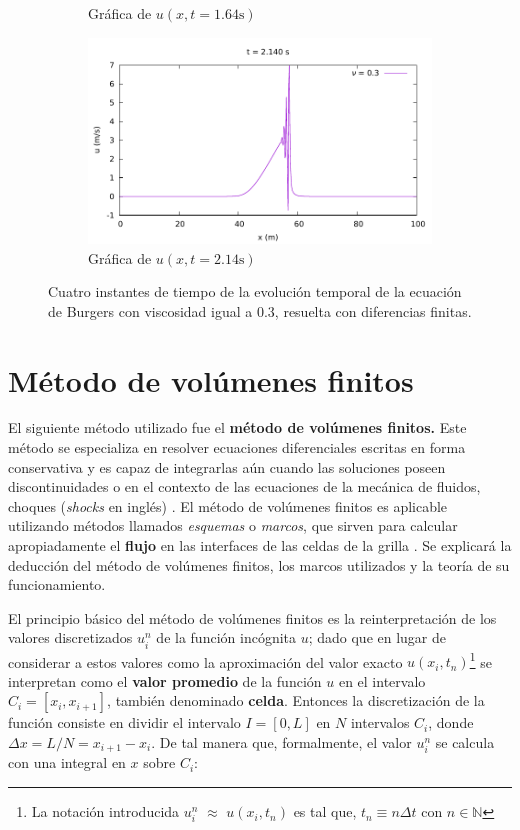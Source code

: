 \documentclass[12pt]{article}
\begin{document}
\begin{figure}[ht]
\begin{subfigure}[b]{0.4\textwidth}
			\caption*{Gráfica de $u(x,t=1.64\unit{\second})$}
			\label{fig:vis0.3-3}
		\end{subfigure}
		\hfill
		\begin{subfigure}[b]{0.4\textwidth}
			\includegraphics[width=\textwidth]{../burg-vis1DDF/results/frames0.3/frame107.pdf}
			\caption*{Gráfica de $u(x,t=2.14\unit{\second})$}
			\label{fig:vis0.3-4}
		\end{subfigure}
		\caption{Cuatro instantes de tiempo de la evolución temporal de la ecuación de Burgers con viscosidad igual a $0.3$, resuelta con diferencias finitas.}
		\label{fig:instantes-nu0.3}
	\end{figure}

	\theoremstyle{definition}
	\newtheorem{definition}{Definición}[section]
	\section{Método de volúmenes finitos}
	El siguiente método utilizado fue el \textbf{método de volúmenes finitos.} Este método se especializa en resolver ecuaciones diferenciales escritas en forma conservativa y es capaz de integrarlas aún cuando las soluciones poseen discontinuidades o  en el contexto de las ecuaciones de la mecánica de fluidos, choques (\textit{shocks} en inglés) \cite{LeVeque1998}. El método de volúmenes finitos es aplicable utilizando métodos llamados \textit{esquemas} o \textit{marcos}, que sirven para calcular apropiadamente el \textbf{flujo} en las interfaces de las celdas de la grilla \cite{LeVeque1998}. Se explicará la deducción del método de volúmenes finitos, los marcos utilizados y la teoría de su funcionamiento.
	
	El principio básico del método de volúmenes finitos es la reinterpretación de los valores discretizados $u_{i}^{n}$ de la función incógnita $u$; dado que en lugar de considerar a estos valores como la aproximación del valor exacto $u(x_{i}, t_{n}) $\footnote{La notación introducida $u_{i}^{n}$ $\approx$ $u(x_{i}, t_{n})$ es tal que, $t_n \equiv n \Delta t $ con $n \in \mathbb{N}$} se interpretan como el \textbf{valor promedio} de la función $u$ en el intervalo $C_{i} = \left[ x_i, x_{i+1} \right]$, también denominado \textbf{celda}. Entonces la discretización de la función consiste en dividir el intervalo $I = [0,L]$ en $N$ intervalos $C_i$, donde $\Delta x = L/N = x_{i+1} - x_i$. De tal manera que, formalmente, el valor $u_{i}^{n}$ se calcula con una integral en $x$ sobre $C_i$:
	
\end{document}
